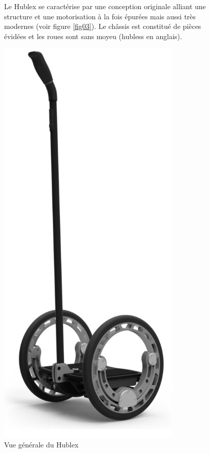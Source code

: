 \begin{figure}[ht!]
\begin{minipage}{0.7\linewidth}
Le Hublex se caractérise par une conception originale alliant une structure et une motorisation à la fois épurées mais aussi très modernes (voir figure \ref{fig03}). Le châssis est constitué de pièces évidées et les roues sont sans moyeu (\og hubless \fg en anglais).
 \end{minipage}\hfill
 \begin{minipage}{0.25\linewidth}
 \includegraphics[width=\linewidth]{img/fig02}
 \caption{\label{fig02}Vue générale du Hublex}
 \end{minipage}
\end{figure}

